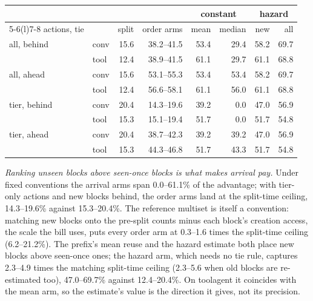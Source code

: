 \begin{center}\small\setlength{\tabcolsep}{2.4pt}
\begin{tabular}{@{}llrrrrrr@{}}
\toprule
& & & & \multicolumn{2}{c}{constant} & \multicolumn{2}{c}{hazard} \\
\cmidrule(lr){5-6}\cmidrule(l){7-8}
actions, tie & & split & order arms & mean & median & new & all \\
\midrule
all, behind  & conv & 15.6 & 38.2--41.5 & 53.4 & 29.4 & 58.2 & 69.7 \\
             & tool & 12.4 & 38.9--41.5 & 61.1 & 29.7 & 61.1 & 68.8 \\
all, ahead   & conv & 15.6 & 53.1--55.3 & 53.4 & 53.4 & 58.2 & 69.7 \\
             & tool & 12.4 & 56.6--58.1 & 61.1 & 56.0 & 61.1 & 68.8 \\
tier, behind & conv & 20.4 & 14.3--19.6 & 39.2 & 0.0 & 47.0 & 56.9 \\
             & tool & 15.3 & 15.1--19.4 & 51.7 & 0.0 & 51.7 & 54.8 \\
tier, ahead  & conv & 20.4 & 38.7--42.3 & 39.2 & 39.2 & 47.0 & 56.9 \\
             & tool & 15.3 & 44.3--46.8 & 51.7 & 43.3 & 51.7 & 54.8 \\
\bottomrule
\end{tabular}
\end{center}

\medskip
\noindent\emph{Ranking unseen blocks above seen-once blocks is what makes arrival pay.} Under fixed
conventions the arrival arms span 0.0--61.1\% of the advantage; with tier-only actions and new blocks
behind, the order arms land at the split-time ceiling, 14.3--19.6\% against 15.3--20.4\%. The reference multiset
is itself a convention: matching new blocks onto the pre-split counts minus each block's creation access,
the scale the bill uses, puts every order arm at 0.3--1.6 times the split-time ceiling
(6.2--21.2\%). The prefix's
mean reuse and the hazard estimate both place new blocks above seen-once ones; the hazard arm, which needs
no tie rule, captures 2.3--4.9 times the matching split-time ceiling (2.3--5.6 when old blocks are
re-estimated too), 47.0--69.7\% against 12.4--20.4\%. On toolagent it coincides with the mean arm, so the
estimate's value is the direction it gives, not its precision.

